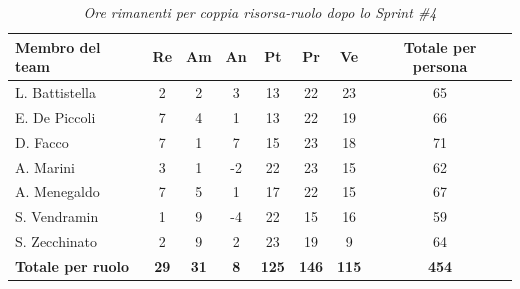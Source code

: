 ﻿\documentclass[a4paper, 10pt, colorlinks=true, linkcolor=black, urlcolor=blue, citecolor=blue, hidelinks]{article}
\renewcommand{\arraystretch}{1.2}
\begin{document}
\begin{table}[H]
    \centering
    \renewcommand{\arraystretch}{1.4}
    \begin{tabular}{|l|c|c|c|c|c|c|c|}
        \hline
        \rowcolor{bluBitless!15}
        \textbf{Membro del team} & \textbf{Re} & \textbf{Am} & \textbf{An} & \textbf{Pt} & \textbf{Pr} & \textbf{Ve} & \textbf{Totale per persona} \\
        \hline
        L. Battistella & 2 & 2 & 3 & 13 & 22 & 23 & 65 \\ \hline
        E. De Piccoli & 7 & 4 & 1 & 13 & 22 & 19 & 66 \\ \hline
        D. Facco & 7 & 1 & 7 & 15 & 23 & 18 & 71 \\ \hline
        A. Marini & 3 & 1 & -2 & 22 & 23 & 15 & 62 \\ \hline
        A. Menegaldo & 7 & 5 & 1 & 17 & 22 & 15 & 67 \\ \hline
        S. Vendramin & 1 & 9 & -4 & 22 & 15 & 16 & 59 \\ \hline
        S. Zecchinato & 2 & 9 & 2 & 23 & 19 & 9 & 64 \\ \hline
        \rowcolor{bluBitless!8}
        \textbf{Totale per ruolo} & \textbf{29} & \textbf{31} & \textbf{8} & \textbf{125} & \textbf{146} & \textbf{115} & \textbf{454} \\
        \hline
    \end{tabular}
    \caption{\textit{Ore rimanenti per coppia risorsa-ruolo dopo lo Sprint \#4}}
\end{table}
\end{document}
